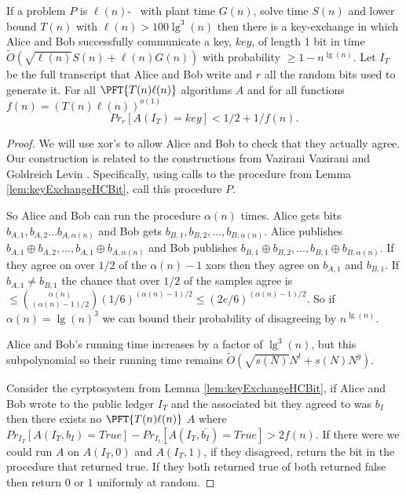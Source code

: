 \begin{lemma}
		If a problem $P$ is $\ell(n)$-\keyER~ with plant time $G(n)$, solve time $S(n)$ and lower bound $T(n)$ with $\ell(n)>100\lg^3(n)$
then there is a key-exchange in which Alice and Bob successfully communicate a key, $key$, of length $1$ bit in time $\tilde{O}(\sqrt{\ell(n)}S(n) + \ell(n)G(n))$ with probability $\geq 1-n^{\lg(n)}$. Let $I_T$ be the full transcript that Alice and Bob write and $r$ all the random bits used to generate it. For all $\PFT{T(n)\ell(n)}$ algorithms $A$ and for all functions $f(n)=\left(T(n)\ell(n)\right)^{o(1)}$
$$Pr_{r}[A(I_T)=key]<1/2+1/f(n).$$	
\end{lemma}
\begin{proof}
We will use xor's to allow Alice and Bob to check that they actually agree. Our construction is related to the constructions from Vazirani Vazirani and Goldreich Levin \cite{xorLemmaVazirani,hardCoreBitsAndXorLemmaFromGL}. Specifically, using calls to the procedure from Lemma \ref{lem:keyExchangeHCBit}, call this procedure $P$. 

So Alice and Bob can run the procedure $\alpha(n)$ times. Alice gets bits $b_{A,1}, b_{A,2} \ldots b_{A,\alpha(n)}$ and Bob gets $b_{B,1},b_{B,2}, \ldots, b_{B,\alpha(n)}$. Alice publishes $b_{A,1} \oplus b_{A,2}, \ldots, b_{A,1} \oplus b_{A,\alpha(n)}$ and Bob publishes $b_{B,1} \oplus b_{B,2}, \ldots, b_{B,1} \oplus b_{B,\alpha(n)}$. If they agree on over $1/2$ of the $\alpha(n)-1$ xors then they agree on $b_{A,1}$ and $b_{B,1}$. If $b_{A,1} \ne b_{B,1}$ the chance that over $1/2$ of the samples agree is $\leq \binom{\alpha(n)}{(\alpha(n)-1)/2}(1/6)^{(\alpha(n)-1)/2} \leq (2e/6)^{(\alpha(n)-1)/2}$. So if $\alpha(n) = \lg(n)^3$ we can bound their probability of disagreeing by $n^{\lg(n)}$.

Alice and Bob's running time increases by a factor of $\lg^3(n)$, but this subpolynomial so their running time remains  $\tilde{O}(\sqrt{s(N)}N^t + s(N)N^g)$. 

Consider the cyrptosystem from Lemma \ref{lem:keyExchangeHCBit}, if Alice and Bob wrote to the public ledger $I_T$ and the associated bit they agreed to was $b_I$ then there exists no $\PFT{T(n)\ell(n)}$ $A$ where $Pr_{I_T}[A(I_T,b_I)=True]-Pr_{I_t}[A(I_T,\overline{b_I})=True]>2f(n)$.  If there were we could run $A$ on $A(I_T,0)$ and $A(I_T,1)$, if they disagreed, return the bit in the procedure that returned true. If they both returned true of both returned false then return $0$ or $1$ uniformly at random. 


\end{proof}
